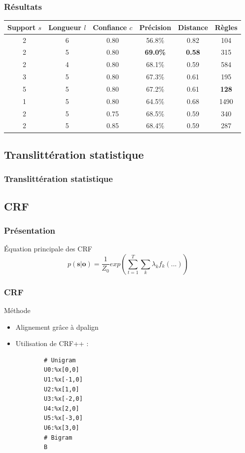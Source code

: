 \documentclass{beamer}
\begin{document}
\begin{frame}
\frametitle{Résultats}

\begin{center}
\begin{tabular}{|c|c|c||c|c|c|}
\hline
Support $s$&Longueur $l$&Confiance $c$&Précision&Distance&Règles\\
\hline
2&6&0.80&56.8\%&0.82&104\\
\hline
2&5&0.80&\textbf{69.0\%}&\textbf{0.58}&315\\
\hline
2&4&0.80&68.1\%&0.59&584\\
\hline
\hline
3&5&0.80&67.3\%&0.61&195\\
\hline
5&5&0.80&67.2\%&0.61&\textbf{128}\\
\hline
1&5&0.80&64.5\%&0.68&1490\\
\hline
\hline
2&5&0.75&68.5\%&0.59&340\\
\hline
2&5&0.85&68.4\%&0.59&287\\
\hline
\end{tabular}
\end{center}
\end{frame}

\subsection{Translittération statistique}

\begin{frame}
	\frametitle{Translittération statistique}
\end{frame}

\subsection{CRF}

\begin{frame}
\frametitle{Présentation}
\begin{block}{Équation principale des CRF}
\begin{equation}
p(\textbf{s}|\textbf{o}) = \frac{1}{Z_0}exp(\sum_{t=1}^T\sum_k \lambda_k f_k(...))
\label{eqcrf}
\end{equation}
\end{block}
\end{frame}

\begin{frame}[fragile]
\frametitle{CRF}
	\begin{block}{Méthode}
		\begin{itemize}
		\item Alignement gr\^ace à dpalign
		\item Utilisation de CRF++ :
		{\scriptsize \begin{verbatim}
		# Unigram
		U0:%x[0,0]
		U1:%x[-1,0]
		U2:%x[1,0]
		U3:%x[-2,0]
		U4:%x[2,0]
		U5:%x[-3,0]
		U6:%x[3,0]
		# Bigram
		B
		\end{verbatim}}
		\end{itemize}
	\end{block}
\end{frame}
\end{document}
